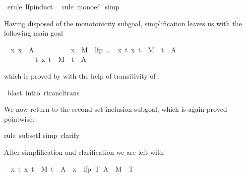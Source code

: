\begin{isabellebody}
\begin{isamarkuptxt}
\end{isamarkuptxt}%
\ erule\ lfp{\isacharunderscore}induct{\isacharparenright}\isanewline
\ \ rule\ mono{\isacharunderscore}ef{\isacharparenright}\isanewline
\ simp{\isacharparenright}%
\begin{isamarkuptxt}%
\noindent
Having disposed of the monotonicity subgoal,
simplification leaves us with the following main goal
\begin{isabelle}
\ {}{\isachardot}\ {\isasymAnd}x{\isachardot}\ x\ {\isasymin}\ A\ {\isasymor}\isanewline
\ \ \ \ \ \ \ \ \ x\ {\isasymin}\ M{\isasyminverse}\ {\isacharbackquote}{\isacharbackquote}\ {\isacharparenleft}lfp\ {\isacharparenleft}\dots{\isacharparenright}\ {\isasyminter}\ {\isacharbraceleft}x{\isachardot}\ {\isasymexists}t{\isachardot}\ {\isacharparenleft}x{\isacharcomma}\ t{\isacharparenright}\ {\isasymin}\ M\isactrlsup {\isacharasterisk}\ {\isasymand}\ t\ {\isasymin}\ A{\isacharbraceright}{\isacharparenright}\isanewline
\ \ \ \ \ \ \ \ {\isasymLongrightarrow}\ {\isasymexists}t{\isachardot}\ {\isacharparenleft}x{\isacharcomma}\ t{\isacharparenright}\ {\isasymin}\ M\isactrlsup {\isacharasterisk}\ {\isasymand}\ t\ {\isasymin}\ A
\end{isabelle}
which is proved by  with the help of transitivity of \isa{\isactrlsup {\isacharasterisk}}:%
\end{isamarkuptxt}%
\ blast\ intro{\isacharcolon}\ rtrancl{\isacharunderscore}trans{\isacharparenright}%
\begin{isamarkuptxt}%
We now return to the second set inclusion subgoal, which is again proved
pointwise:%
\end{isamarkuptxt}%
rule\ subsetI{\isacharparenright}\isanewline
{}simp{\isacharcomma}\ clarify{\isacharparenright}%
\begin{isamarkuptxt}%
\noindent
After simplification and clarification we are left with
\begin{isabelle}%
\ {}{\isachardot}\ {\isasymAnd}x\ t{\isachardot}\ {\isasymlbrakk}{\isacharparenleft}x{\isacharcomma}\ t{\isacharparenright}\ {\isasymin}\ M\isactrlsup {\isacharasterisk}{\isacharsemicolon}\ t\ {\isasymin}\ A{\isasymrbrakk}\ {\isasymLongrightarrow}\ x\ {\isasymin}\ lfp\ {\isacharparenleft}{\isasymlambda}T{\isachardot}\ A\ {\isasymunion}\ M{\isasyminverse}\ {\isacharbackquote}{\isacharbackquote}\ T{\isacharparenright}%

\end{isabelle}
\end{isamarkuptxt}
\end{isabellebody}
